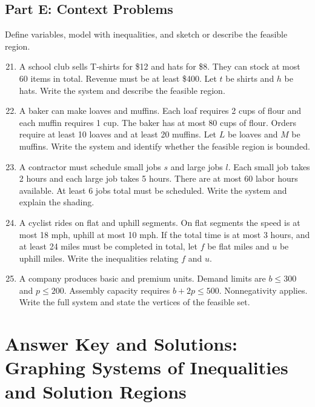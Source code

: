 \documentclass[12pt]{article}
\begin{document}
\subsection*{Part E: Context Problems}
Define variables, model with inequalities, and sketch or describe the feasible region.
\begin{enumerate}
  \setcounter{enumi}{20}
  \item A school club sells T-shirts for \$12 and hats for \$8. They can stock at most 60 items in total. Revenue must be at least \$400. Let \(t\) be shirts and \(h\) be hats. Write the system and describe the feasible region.
  \item A baker can make loaves and muffins. Each loaf requires 2 cups of flour and each muffin requires 1 cup. The baker has at most 80 cups of flour. Orders require at least 10 loaves and at least 20 muffins. Let \(L\) be loaves and \(M\) be muffins. Write the system and identify whether the feasible region is bounded.
  \item A contractor must schedule small jobs \(s\) and large jobs \(l\). Each small job takes 2 hours and each large job takes 5 hours. There are at most 60 labor hours available. At least 6 jobs total must be scheduled. Write the system and explain the shading.
  \item A cyclist rides on flat and uphill segments. On flat segments the speed is at most 18 mph, uphill at most 10 mph. If the total time is at most 3 hours, and at least 24 miles must be completed in total, let \(f\) be flat miles and \(u\) be uphill miles. Write the inequalities relating \(f\) and \(u\).
  \item A company produces basic and premium units. Demand limits are \(b \le 300\) and \(p \le 200\). Assembly capacity requires \(b + 2p \le 500\). Nonnegativity applies. Write the full system and state the vertices of the feasible set.
\end{enumerate}

\newpage


\section*{Answer Key and Solutions: Graphing Systems of Inequalities and Solution Regions}
\end{document}
